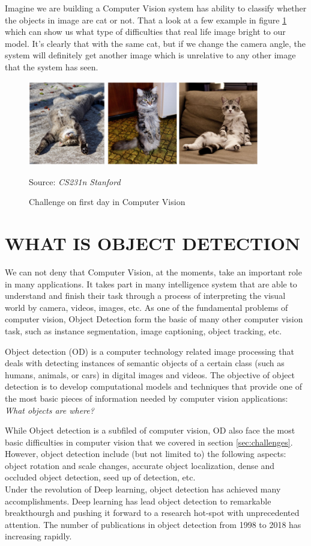 \documentclass[12pt]{article}
\newcommand{\source}[1]{\caption*{Source: \emph{#1}} }
\begin{document}
Imagine we are building a Computer Vision system has ability to classify whether 
the objects in image are cat or not. That a look at a few example in figure \ref{fig:challenge} 
which can show us what type of difficulties that real life image 
bright to our model.
It's clearly that with the same cat, but if we change the camera angle, 
the system will definitely get another image which is unrelative to any other 
image that the system has seen.

\begin{figure}[htp]
    \centering
    \includegraphics[width=0.9\textwidth]{images/cat_demo.png}
    \caption{Challenge on first day in Computer Vision }
    \label{fig:challenge}
    \source{CS231n Stanford}
\end{figure}

\section{WHAT IS OBJECT DETECTION}
We can not deny that Computer Vision, at the moments, take an important role in many 
applications. It takes part in many intelligence system that are able to understand and finish
their task through a process of interpreting the visual world by camera, videos, images, etc.
As one of the fundamental problems of computer vision, Object Detection form the basic 
of many other computer vision task, such as instance segmentation, image captioning, 
object tracking, etc. 

Object detection (OD) is a computer technology related image processing that deals 
with detecting instances of semantic objects of a certain class (such as humans, animals, or cars) 
in digital images and videos. 
The objective of object detection is to develop computational models and techniques that provide 
one of the most basic pieces of information needed by computer vision applications:
\emph{What objects are where?} 

While Object detection is a subfiled of computer vision, OD also face the most basic 
difficulties in computer vision that we covered in section \ref{sec:challenges}. However, 
object detection include (but not limited to) the following aspects: object rotation and
scale changes, accurate object localization, dense and occluded object detection, seed up of detection, etc. \\
Under the revolution of Deep learning, object detection has achieved many accomplishments.
Deep learning has lead object detection to remarkable breakthourgh and pushing it forward
to a research hot-spot with unprecedented attention. The number of publications
in object detection from 1998 to 2018 has increasing rapidly. \cite{zou2019object}
\end{document}
